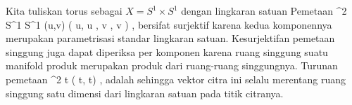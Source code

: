 Kita tuliskan torus sebagai $X=S^1 \times S^1$ dengan lingkaran satuan
Pemetaan
\maabbeledisp {\varphi} {\R^2} {S^1 \times S^1
} {(u,v)} {( \cos  u, \sin  u , \cos  v , \sin  v )
} {,}
bersifat surjektif karena kedua komponennya merupakan parametrisasi standar lingkaran satuan. Kesurjektifan pemetaan singgung juga dapat diperiksa per komponen karena ruang singgung suatu manifold produk merupakan produk dari ruang-ruang singgungnya. Turunan pemetaan
\maabbeledisp {} {\R} { \R^2
} { t } { ( \cos  t, \sin  t)
} {,}
adalah
 sehingga vektor citra ini selalu merentang ruang singgung satu dimensi dari lingkaran satuan pada titik citranya.
